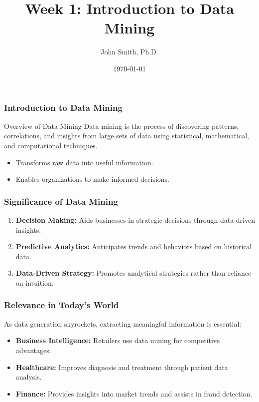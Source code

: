 \documentclass[aspectratio=169]{beamer}
\title[Data Mining]{Week 1: Introduction to Data Mining}
\author[J. Smith]{John Smith, Ph.D.}
\institute[University Name]{
  Department of Computer Science\\
  University Name\\
  \vspace{0.3cm}
  Email: email@university.edu\\
  Website: www.university.edu
}
\date{\today}
\begin{document}
\frame{\titlepage}

\begin{frame}[fragile]
    \frametitle{Introduction to Data Mining}
    \begin{block}{Overview of Data Mining}
        Data mining is the process of discovering patterns, correlations, and insights from large sets of data using statistical, mathematical, and computational techniques.
        \begin{itemize}
            \item Transforms raw data into useful information.
            \item Enables organizations to make informed decisions.
        \end{itemize}
    \end{block}
\end{frame}

\begin{frame}[fragile]
    \frametitle{Significance of Data Mining}
    \begin{enumerate}
        \item \textbf{Decision Making:} Aids businesses in strategic decisions through data-driven insights.
        \item \textbf{Predictive Analytics:} Anticipates trends and behaviors based on historical data.
        \item \textbf{Data-Driven Strategy:} Promotes analytical strategies rather than reliance on intuition.
    \end{enumerate}
\end{frame}

\begin{frame}[fragile]
    \frametitle{Relevance in Today’s World}
    As data generation skyrockets, extracting meaningful information is essential:
    \begin{itemize}
        \item \textbf{Business Intelligence:} Retailers use data mining for competitive advantages.
        \item \textbf{Healthcare:} Improves diagnosis and treatment through patient data analysis.
        \item \textbf{Finance:} Provides insights into market trends and assists in fraud detection.
    \end{itemize}
\end{frame}
\end{document}
